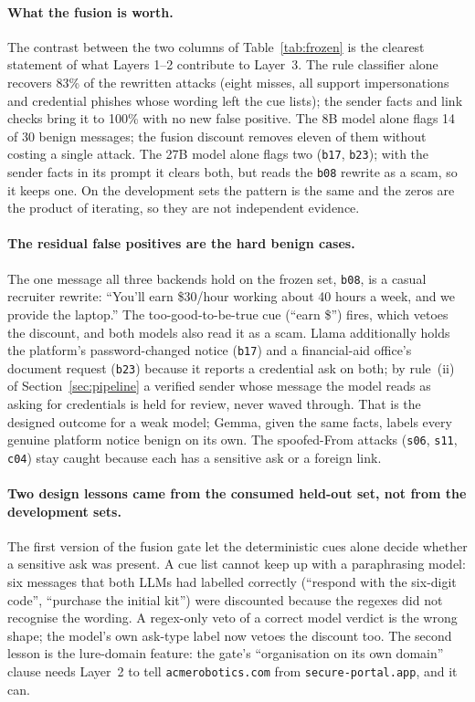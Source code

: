 \documentclass[10pt,twocolumn]{article}
\newcommand{\code}[1]{\texttt{#1}}
\begin{document}
\paragraph{What the fusion is worth.} The contrast between the two columns of Table~\ref{tab:frozen} is the clearest statement of what Layers 1--2 contribute to Layer~3. The rule classifier alone recovers 83\% of the rewritten attacks (eight misses, all support impersonations and credential phishes whose wording left the cue lists); the sender facts and link checks bring it to 100\% with no new false positive. The 8B model alone flags 14 of 30 benign messages; the fusion discount removes eleven of them without costing a single attack. The 27B model alone flags two (\code{b17}, \code{b23}); with the sender facts in its prompt it clears both, but reads the \code{b08} rewrite as a scam, so it keeps one. On the development sets the pattern is the same and the zeros are the product of iterating, so they are not independent evidence.

\paragraph{The residual false positives are the hard benign cases.} The one message all three backends hold on the frozen set, \code{b08}, is a casual recruiter rewrite: ``You'll earn \$30/hour working about 40 hours a week, and we provide the laptop.'' The too-good-to-be-true cue (``earn \$'') fires, which vetoes the discount, and both models also read it as a scam. Llama additionally holds the platform's password-changed notice (\code{b17}) and a financial-aid office's document request (\code{b23}) because it reports a credential ask on both; by rule~(ii) of Section~\ref{sec:pipeline} a verified sender whose message the model reads as asking for credentials is held for review, never waved through. That is the designed outcome for a weak model; Gemma, given the same facts, labels every genuine platform notice benign on its own. The spoofed-From attacks (\code{s06}, \code{s11}, \code{c04}) stay caught because each has a sensitive ask or a foreign link.

\paragraph{Two design lessons came from the consumed held-out set, not from the development sets.} The first version of the fusion gate let the deterministic cues alone decide whether a sensitive ask was present. A cue list cannot keep up with a paraphrasing model: six messages that both LLMs had labelled correctly (``respond with the six-digit code'', ``purchase the initial kit'') were discounted because the regexes did not recognise the wording. A regex-only veto of a correct model verdict is the wrong shape; the model's own ask-type label now vetoes the discount too. The second lesson is the lure-domain feature: the gate's ``organisation on its own domain'' clause needs Layer~2 to tell \code{acmerobotics.com} from \code{secure-portal.app}, and it can.
\end{document}
